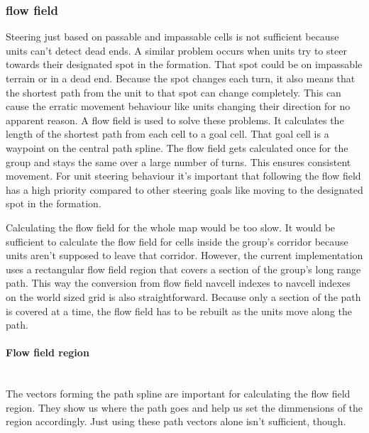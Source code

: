 \documentclass[a4paper,10pt]{article}
\begin{document}
\subsubsection{flow field}
Steering just based on passable and impassable cells is not sufficient because units can't detect dead ends. 
A similar problem occurs when units try to steer towards their designated spot in the formation.
That spot could be on impassable terrain or in a dead end.
Because the spot changes each turn, it also means that the shortest path from the unit to that spot can change completely.
This can cause the erratic movement behaviour like units changing their direction for no apparent reason. 
A flow field is used to solve these problems.
It calculates the length of the shortest path from each cell to a goal cell.
That goal cell is a waypoint on the central path spline.
The flow field gets calculated once for the group and stays the same over a large number of turns.
This ensures consistent movement.
For unit steering behaviour it's important that following the flow field has a high priority compared to other steering goals like moving to the designated spot in the formation.


Calculating the flow field for the whole map would be too slow.
It would be sufficient to calculate the flow field for cells inside the group's corridor because units aren't supposed to leave that corridor.
However, the current implementation uses a rectangular flow field region that covers a section of the group's long range path. 
This way the conversion from flow field navcell indexes to navcell indexes on the world sized grid is also straightforward.
Because only a section of the path is covered at a time, the flow field has to be rebuilt as the units move along the path.

\paragraph{Flow field region} ~\\

The vectors forming the path spline are important for calculating the flow field region.
They show us where the path goes and help us set the dimmensions of the region accordingly.
Just using these path vectors alone isn't sufficient, though.
\end{document}
